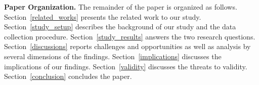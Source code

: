 \noindent\textbf{Paper Organization.} The remainder of the paper is organized as
follows. Section~\ref{related_works} presents the related work to our study.
Section~\ref{study_setup} describes the background of our study and the data
collection procedure. Section~\ref{study_results} answers the two research questions. Section~\ref{discussions} reports
challenges and opportunities as well as analysis by several dimensions of
the findings. Section~\ref{implications} discusses the
implications of our findings. Section~\ref{validity} discusses the threats to
validity. Section~\ref{conclusion} concludes the paper.
